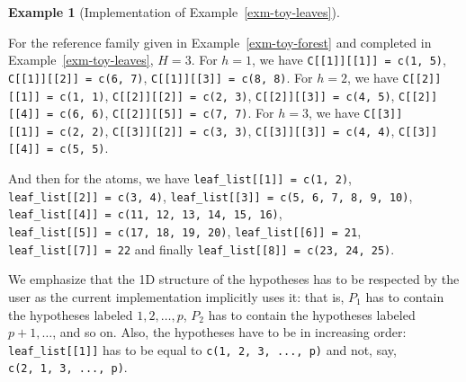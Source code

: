 \documentclass[
  11pt,
  a4paper,
]{article}
\theoremstyle{plain}
\theoremstyle{definition}
\newtheorem{example}{Example}[section]
\theoremstyle{plain}
\theoremstyle{definition}
\theoremstyle{plain}
\theoremstyle{remark}
\newcounter{quartocalloutcauno}
\newcommand{\quartocalloutcau}[1]{\refstepcounter{quartocalloutcauno}\label{#1}}
\begin{document}
\begin{example}[Implementation of
Example~\ref{exm-toy-leaves}]\protect\hypertarget{exm-implementation}{}\label{exm-implementation}

For the reference family given in Example~\ref{exm-toy-forest} and
completed in Example~\ref{exm-toy-leaves}, \(H=3\). For \(h=1\), we have
\texttt{C{[}{[}1{]}{]}{[}{[}1{]}{]}\ =\ c(1,\ 5)},
\texttt{C{[}{[}1{]}{]}{[}{[}2{]}{]}\ =\ c(6,\ 7)},
\texttt{C{[}{[}1{]}{]}{[}{[}3{]}{]}\ =\ c(8,\ 8)}. For \(h=2\), we have
\texttt{C{[}{[}2{]}{]}{[}{[}1{]}{]}\ =\ c(1,\ 1)},
\texttt{C{[}{[}2{]}{]}{[}{[}2{]}{]}\ =\ c(2,\ 3)},
\texttt{C{[}{[}2{]}{]}{[}{[}3{]}{]}\ =\ c(4,\ 5)},
\texttt{C{[}{[}2{]}{]}{[}{[}4{]}{]}\ =\ c(6,\ 6)},
\texttt{C{[}{[}2{]}{]}{[}{[}5{]}{]}\ =\ c(7,\ 7)}. For \(h=3\), we have
\texttt{C{[}{[}3{]}{]}{[}{[}1{]}{]}\ =\ c(2,\ 2)},
\texttt{C{[}{[}3{]}{]}{[}{[}2{]}{]}\ =\ c(3,\ 3)},
\texttt{C{[}{[}3{]}{]}{[}{[}3{]}{]}\ =\ c(4,\ 4)},
\texttt{C{[}{[}3{]}{]}{[}{[}4{]}{]}\ =\ c(5,\ 5)}.

And then for the atoms, we have
\texttt{leaf\_list{[}{[}1{]}{]}\ =\ c(1,\ 2)},
\texttt{leaf\_list{[}{[}2{]}{]}\ =\ c(3,\ 4)},
\texttt{leaf\_list{[}{[}3{]}{]}\ =\ c(5,\ 6,\ 7,\ 8,\ 9,\ 10)},
\texttt{leaf\_list{[}{[}4{]}{]}\ =\ c(11,\ 12,\ 13,\ 14,\ 15,\ 16)},
\texttt{leaf\_list{[}{[}5{]}{]}\ =\ c(17,\ 18,\ 19,\ 20)},
\texttt{leaf\_list{[}{[}6{]}{]}\ =\ 21},
\texttt{leaf\_list{[}{[}7{]}{]}\ =\ 22} and finally
\texttt{leaf\_list{[}{[}8{]}{]}\ =\ c(23,\ 24,\ 25)}.

\end{example}

\begin{tcolorbox}[enhanced jigsaw, leftrule=.75mm, bottomtitle=1mm, left=2mm, coltitle=black, bottomrule=.15mm, opacityback=0, colbacktitle=quarto-callout-caution-color!10!white, breakable, titlerule=0mm, colframe=quarto-callout-caution-color-frame, colback=white, arc=.35mm, toptitle=1mm, rightrule=.15mm, opacitybacktitle=0.6, title=\textcolor{quarto-callout-caution-color}{\faFire}\hspace{0.5em}{Caution \ref*{cau-impl} }, toprule=.15mm]

\quartocalloutcau{cau-impl} 

We emphasize that the 1D structure of the hypotheses has to be respected
by the user as the current implementation implicitly uses it: that is,
\(P_1\) has to contain the hypotheses labeled \(1, 2, \dotsc, p\),
\(P_2\) has to contain the hypotheses labeled \(p+1, \dotsc\), and so
on. Also, the hypotheses have to be in increasing order:
\texttt{leaf\_list{[}{[}1{]}{]}} has to be equal to
\texttt{c(1,\ 2,\ 3,\ ...,\ p)} and not, say,
\texttt{c(2,\ 1,\ 3,\ ...,\ p)}.

\end{tcolorbox}
\end{document}
